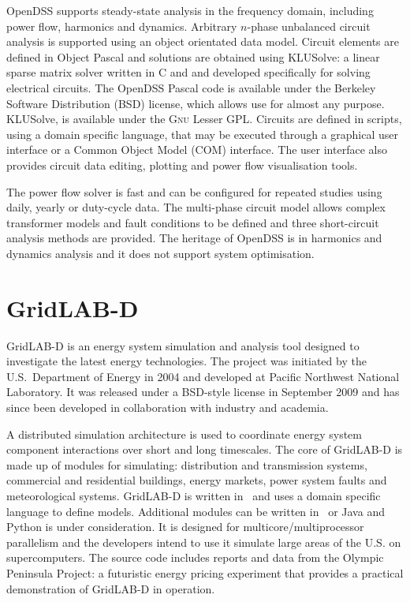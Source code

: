 OpenDSS supports steady-state analysis in the frequency domain, including power
flow, harmonics and dynamics.  Arbitrary $n$-phase unbalanced circuit analysis
is supported using an object orientated data model.  Circuit elements are
defined in Object Pascal and solutions are obtained using KLUSolve: a linear
sparse matrix solver written in C and \CC and developed specifically for solving
electrical circuits. The OpenDSS Pascal code is available under the Berkeley
Software Distribution (BSD) license, which allows use for almost any purpose.
KLUSolve, is available under the \textsc{Gnu} Lesser GPL. Circuits are defined
in scripts, using a domain specific language, that may be executed through a
graphical user interface or a Common Object Model (COM) interface. The user
interface also provides circuit data editing, plotting and power flow
visualisation tools.

The power flow solver is fast and can be configured for repeated studies using
daily, yearly or duty-cycle data.  The multi-phase circuit model allows complex
transformer models and fault conditions to be defined and three short-circuit
analysis methods are provided.  The heritage of OpenDSS is in harmonics and
dynamics analysis and it does not support system optimisation.

\section{GridLAB-D}
GridLAB-D is an energy system simulation and analysis tool
designed to investigate the latest energy technologies.  The project was
initiated by the U.S.~Department of Energy in 2004 and developed at Pacific
Northwest National Laboratory.  It was released under a BSD-style license in
September 2009 and has since been developed in collaboration with industry and
academia.

A distributed simulation architecture is used to coordinate energy system
component interactions over short and long timescales.  The core of GridLAB-D is
made up of modules for simulating: distribution and transmission systems,
commercial and residential buildings, energy markets, power system faults and
meteorological systems.  GridLAB-D is written in \CC~and uses a domain specific
language to define models.  Additional modules can be written in \CC~or Java and
Python is under consideration.  It is designed for multicore/multiprocessor
parallelism and the developers intend to use it simulate large areas of the U.S.
on supercomputers.  The source code includes reports and data from the Olympic
Peninsula Project: a futuristic energy pricing experiment that provides a
practical demonstration of GridLAB-D in operation.

